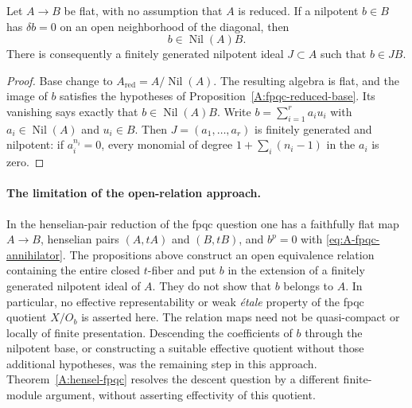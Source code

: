 \begin{corollary}
\label{A:fpqc-nilpotent-base-reduction}
Let $A\to B$ be flat, with no assumption that $A$ is reduced.
If a nilpotent $b\in B$ has $\delta b=0$ on an open neighborhood
of the diagonal, then
\[
                    b\in\operatorname{Nil}(A)B.
\]
There is consequently a finitely generated nilpotent ideal
$J\subset A$ such that $b\in JB$.
\end{corollary}
\begin{proof}
Base change to $A_{\mathrm{red}}=A/\operatorname{Nil}(A)$.
The resulting algebra is flat, and the image of $b$ satisfies
the hypotheses of Proposition~\ref{A:fpqc-reduced-base}.
Its vanishing says exactly that $b\in\operatorname{Nil}(A)B$.
Write $b=\sum_{i=1}^r a_i u_i$ with $a_i\in\operatorname{Nil}(A)$
and $u_i\in B$.  Then $J=(a_1,\ldots,a_r)$ is finitely generated
and nilpotent: if $a_i^{n_i}=0$, every monomial of degree
$1+\sum_i(n_i-1)$ in the $a_i$ is zero.
\end{proof}

\paragraph{The limitation of the open-relation approach.}
In the henselian-pair reduction of the fpqc question one has a
faithfully flat map $A\to B$, henselian pairs $(A,tA)$ and $(B,tB)$,
and $b^p=0$ with \eqref{eq:A-fpqc-annihilator}.  The propositions above construct an
open equivalence relation containing the entire closed $t$-fiber
and put $b$ in the extension of a finitely generated nilpotent ideal
of $A$.  They do not show that $b$ belongs to $A$.
In particular, no effective representability or weak \emph{\'etale}
property of the fpqc quotient $X/O_b$ is asserted here.
The relation maps need not be quasi-compact or locally of finite
presentation.  Descending the coefficients of $b$ through the
nilpotent base, or constructing a suitable effective quotient
without those additional hypotheses, was the remaining step in
this approach.  Theorem~\ref{A:hensel-fpqc} resolves the descent
question by a different finite-module argument, without asserting
effectivity of this quotient.
